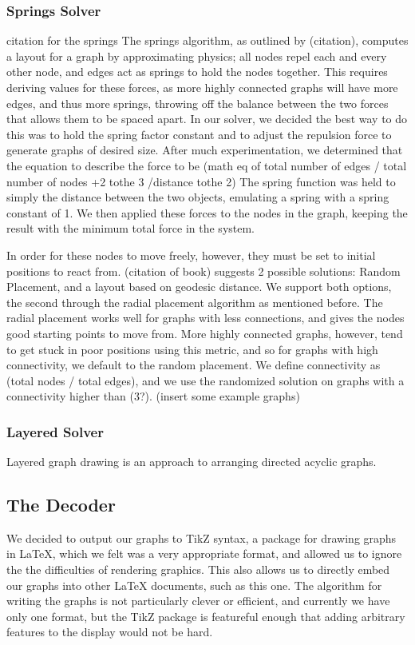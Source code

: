 \documentclass{article}
\begin{document}
\subsubsection{Springs Solver}
citation for the springs\cite{springs}
The springs algorithm, as outlined by (citation), computes a layout for a graph by approximating physics; all nodes repel each and every other node, 
and edges act as springs to hold the nodes together. This requires deriving values for these forces, as more highly connected graphs will have 
more edges, and thus more springs, throwing off the balance between the two forces that allows them to be spaced apart. In our solver, we decided
the best way to do this was to hold the spring factor constant and to adjust the repulsion force to generate graphs of desired size. After much 
experimentation, we determined that the equation to describe the force to be (math eq of total number of edges / total number of nodes +2 tothe 3 /distance tothe 2)
The spring function was held to simply the distance between the two objects, emulating a spring with a spring constant of 1. We then applied these forces
to the nodes in the graph, keeping the result with the minimum total force in the system.

In order for these nodes to move freely, however, they must be set to initial positions to react from. (citation of book) suggests 2 possible solutions: 
Random Placement, and a layout based on geodesic distance. We support both options, the second through the radial placement algorithm as mentioned before.
The radial placement works well for graphs with less connections, and gives the nodes good starting points to move from. More highly connected graphs,
however, tend to get stuck in poor positions using this metric, and so for graphs with high connectivity, we default to the random placement. We define 
connectivity as (total nodes / total edges), and we use the randomized solution on graphs with a connectivity higher than (3?).
(insert some example graphs)

\subsubsection{Layered Solver}
Layered graph drawing is an approach to arranging directed acyclic graphs.


\subsection{The Decoder}
We decided to output our graphs to TikZ syntax, a package for drawing graphs in LaTeX, which we felt was a very appropriate format, and allowed us to ignore the 
the difficulties of rendering graphics. This also allows us to directly embed our graphs into other LaTeX documents, such as this one. The algorithm for 
writing the graphs is not particularly clever or efficient, and currently we have only one format, but the TikZ package is featureful enough that adding arbitrary
features to the display would not be hard.
\end{document}
